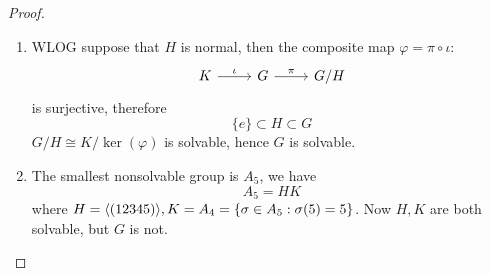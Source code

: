 \begin{proof}
    \begin{enumerate}
        \item WLOG suppose that $H$ is normal, then the composite map $\varphi=\pi\circ\iota$: 
        \[\begin{tikzcd}
            K & G & {G/H}
            \arrow["\iota", from=1-1, to=1-2]
            \arrow["\pi", from=1-2, to=1-3]
        \end{tikzcd}\]
        is surjective, therefore 
        \begin{equation*}
            \{e\}\subset H\subset G
        \end{equation*}
        $G/H\cong K/\ker(\varphi)$ is solvable, hence $G$ is solvable.
        \item The smallest nonsolvable group is $A_5$, we have 
        \begin{equation*}
            A_5=HK
        \end{equation*}
        where $H=\langle(12345)\rangle, K=A_4=\{\sigma\in A_5: \sigma(5)=5\}$. Now $H, K$ are both solvable, but $G$ is not.
    \end{enumerate}
\end{proof}

